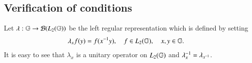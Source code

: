 \documentclass[leqno]{amsart}
\begin{document}
%		
%		
%	
%	
%	
	 
	
	
	
	
	
	
	\subsection{Verification of conditions}
	
	Let $\lambda:\mathbb{G}\rightarrow{\mathcal B}(L_{2}(\mathbb{G}))$ be the left regular representation which is defined by setting
	\begin{align*}
		\lambda_{x}f(y)=f(x^{-1} y),\quad f\in L_{2}(\mathbb{G}),\quad x, y\in\mathbb{G}.
	\end{align*}
	It is easy to see that $\lambda_{x}$ is a unitary operator on $L_{2}(\mathbb{G})$ and $\lambda_{x}^{-1}=\lambda_{x^{-1}}$. 
	
\end{document}

